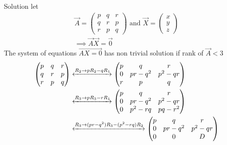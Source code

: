 \documentclass{beamer}
\numberwithin{equation}{section}
\theoremstyle{remark}
\newcommand{\myvec}[1]{\ensuremath{\begin{pmatrix}#1\end{pmatrix}}}
\begin{document}
\begin{frame}{Solution}
let 
\begin{align}
    \Vec{A}=\begin{pmatrix}
        p & q & r\\
        q & r & p\\
        r & p & q
    \end{pmatrix} \text{ and } \Vec{X}=\myvec{x\\y\\z}\\
    \implies \Vec{A}\Vec{X}=\Vec{0}
\end{align}
The system of equations $\Vec{AX = 0}$ has non trivial solution if rank of $\Vec{A}<3$
\begin{align}
      \begin{pmatrix}
        p & q & r\\
        q & r & p\\
        r & p & q
    \end{pmatrix} &\xleftrightarrow{R_2 \rightarrow pR_2- qR_1} 
    \begin{pmatrix}
        p & q & r \\
        0 & pr-q^2 & p^2-qr \\
        r & p & q 
\end{pmatrix}\\
&\xleftrightarrow{R_3 \rightarrow pR_3- rR_1} \begin{pmatrix}
        p & q & r \\
        0 & pr-q^2 & p^2-qr \\
        0 & p^2-rq & pq-r^2 
\end{pmatrix}\\
&\xleftrightarrow{R_3 \rightarrow (pr-q^2)R_3 - (p^2-rq)R_2} \begin{pmatrix}
        p & q & r \\
        0 & pr-q^2 & p^2-qr \\
        0 & 0 & D 
\end{pmatrix}
\end{align}
\end{frame}
\end{document}
